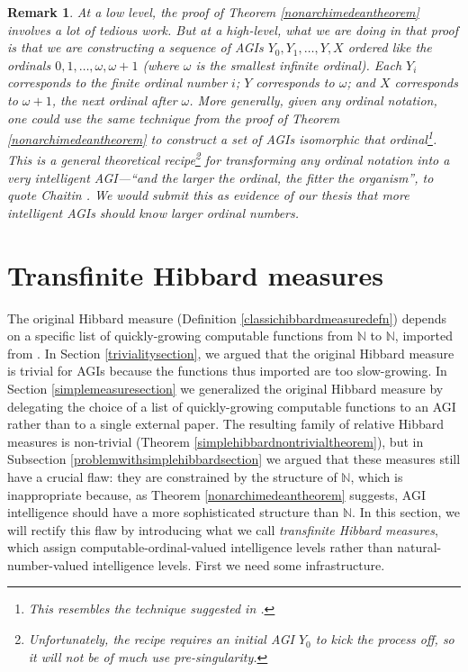 \documentclass{article}
\newtheorem{remark}[theorem]{Remark}
\begin{document}
\begin{remark}
    At a low level, the proof of Theorem \ref{nonarchimedeantheorem} involves a
    lot of tedious work. But at a high-level, what we are doing in that proof is
    that we are constructing a sequence of AGIs $Y_0,Y_1,\ldots,Y,X$
    ordered like the ordinals $0,1,\ldots,\omega,\omega+1$
    (where $\omega$ is the smallest infinite ordinal).
    Each $Y_i$ corresponds to the finite ordinal number $i$; $Y$ corresponds to $\omega$;
    and $X$ corresponds to $\omega+1$, the next
    ordinal after $\omega$. More generally, given any ordinal notation, one could
    use the same technique from the proof of Theorem \ref{nonarchimedeantheorem} to
    construct a set of AGIs isomorphic that ordinal\footnote{This
    resembles the technique suggested in \cite{good1969godel}.}.
    This is a general theoretical
    recipe\footnote{Unfortunately,
    the recipe requires an initial AGI $Y_0$ to kick the process off, so it will not be
    of much use pre-singularity.} for transforming any ordinal notation into a very intelligent
    AGI---``and the larger the ordinal, the fitter the organism'',
    to quote Chaitin \cite{chaitin}.
    We would submit this as evidence of our thesis
    \cite{ioi1} \cite{ioi2} that more intelligent AGIs should know larger ordinal numbers.
\end{remark}

\section{Transfinite Hibbard measures}

The original Hibbard measure
(Definition \ref{classichibbardmeasuredefn}) depends on a specific list of
quickly-growing computable functions from $\mathbb N$ to $\mathbb N$, imported from
\cite{liu1960enumeration}. In Section \ref{trivialitysection}, we argued
that the original Hibbard measure is trivial for AGIs because the functions thus imported
are too slow-growing.
In Section \ref{simplemeasuresection} we generalized
the original Hibbard measure
by delegating the choice of a list of quickly-growing computable functions to an AGI rather
than to a single external paper. The resulting family of relative Hibbard measures is
non-trivial (Theorem \ref{simplehibbardnontrivialtheorem}), but in
Subsection \ref{problemwithsimplehibbardsection} we argued that these
measures still have a crucial flaw: they are constrained by the structure of
$\mathbb N$, which is inappropriate because, as Theorem \ref{nonarchimedeantheorem}
suggests, AGI intelligence should have a more sophisticated structure than $\mathbb N$.
In this section, we will rectify this flaw by introducing what we call \emph{transfinite
Hibbard measures}, which assign computable-ordinal-valued intelligence levels rather than
natural-number-valued intelligence levels. First we need some infrastructure.
\end{document}
